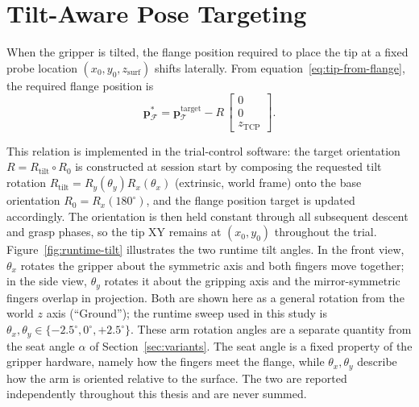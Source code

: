\section{Tilt-Aware Pose Targeting}
\label{sec:tilt-pose}

When the gripper is tilted, the flange position required to place the tip at
a fixed probe location $(x_0, y_0, z_{\text{surf}})$ shifts
laterally. From equation~\eqref{eq:tip-from-flange}, the required flange
position is
\begin{equation}
  \mathbf{p}_\mathcal{F}^{*} = \mathbf{p}_\mathcal{T}^{\text{target}} -
                              R\,\begin{bmatrix} 0 \\ 0 \\ z_{\text{TCP}} \end{bmatrix}.
  \label{eq:flange-target-tilted}
\end{equation}

This relation is implemented in the trial-control software:
the target orientation $R = R_{\text{tilt}} \circ R_0$ is constructed at
session start by composing the requested tilt rotation
$R_{\text{tilt}} = R_y(\theta_y) R_x(\theta_x)$ (extrinsic, world frame)
onto the base orientation $R_0 = R_x(180^{\circ})$, and the flange position
target is updated accordingly. The orientation is then held constant
through all subsequent descent and grasp phases, so the tip XY remains at
$(x_0, y_0)$ throughout the trial. Figure~\ref{fig:runtime-tilt}
illustrates the two runtime tilt angles. In the front view, $\theta_x$
rotates the gripper about the symmetric axis and both fingers move
together; in the side view, $\theta_y$ rotates it about the gripping
axis and the mirror-symmetric fingers overlap in projection. Both are shown here as
a general rotation from the world $z$ axis (``Ground''); the runtime
sweep used in this study is $\theta_x, \theta_y \in
\{-2.5^{\circ}, 0^{\circ}, +2.5^{\circ}\}$. These arm rotation angles
are a separate quantity from the seat angle $\alpha$ of
Section~\ref{sec:variants}. The seat angle is a fixed property of the
gripper hardware, namely how the fingers meet the flange, while
$\theta_x, \theta_y$ describe how the arm is oriented relative to the
surface. The two are
reported independently throughout this thesis and are never summed.

